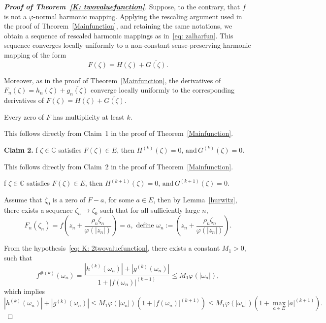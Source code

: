 \documentclass[11pt, reqno]{amsart}
\numberwithin{equation}{section}
\theoremstyle{definition}
\theoremstyle{remark}
\theoremstyle{plain}
\begin{document}
\begin{proof}[\bf{Proof of Theorem~\ref{K: twovaluefunction}}]
 Suppose, to the contrary, that $f$ is not a
  $\varphi$-normal harmonic mapping.
   Applying the rescaling
argument used in the proof of Theorem~\ref{Mainfunction}, 
and retaining the same notations, we obtain
  a sequence of rescaled harmonic mappings as in~\eqref{eq: zalharfun}.
This sequence converges locally uniformly to a non-constant 
sense-preserving harmonic mapping of the form
  \[
  F(\zeta)=H(\zeta)+\overline{G(\zeta)}.
  \]

Moreover, as in the proof of Theorem~\ref{Mainfunction}, the derivatives
of $F_n(\zeta)=h_n(\zeta)+\overline{g_n(\zeta)}$ converge locally 
uniformly to the corresponding 
derivatives of $F(\zeta)=H(\zeta)+\overline{G(\zeta)}$.\smallskip

 Every zero of $F$ has multiplicity 
at least $k$.\smallskip

This follows directly from Claim~1 in the proof of
Theorem~\ref{Mainfunction}.\smallskip

 \noindent
\textbf{Claim 2.}
f $\zeta \in \mathbb{C}$ satisfies $F(\zeta)\in E$, then
$
H^{(k)}(\zeta)=0,\,
\text{and}\,
G^{(k)}(\zeta)=0.
$\smallskip

This follows directly from Claim~2 in the proof of
Theorem~\ref{Mainfunction}.
\smallskip

 f $\zeta \in \mathbb{C}$ satisfies $F(\zeta)\in E$, 
then
$ H^{(k+1)}(\zeta)=0, 
\,\text{and} \, G^{(k+1)}(\zeta)=0$.

Assume that $\zeta_0$ is a zero of $F-a$, for some $a\in E$, 
then by Lemma~\ref{hurwitz}, there exists a sequence $\zeta_n \to \zeta_0$
 such that for all sufficiently large $n$,
 \[
 F_n(\zeta_n)=f\!\left(
z_n+\frac{\rho_n\zeta_n}{\varphi(|z_n|)}
\right)=a, \,\, \text{define} \,\, \omega_n:=\!\left(
z_n+\frac{\rho_n\zeta_n}{\varphi(|z_n|)}
\right).
 \]
 \smallskip
 
From the hypothesis~\eqref{eq: K: 2twovaluefunction}, there exists a constant 
$M_1>0$, such that
 \[
 f^{\#(k)}(\omega_n)=\frac{|h^{(k)}(\omega_n)|+
 |g^{(k)}(\omega_n)|}{1+|f(\omega_n)|^{(k+1)}}
 \leq M_1\varphi(|\omega_n|),
 \]
 which implies
\begin{equation}\label{*2}
  {|h^{(k)}(\omega_n)|+|g^{(k)}(\omega_n)|}\leq 
  M_1\varphi(|\omega_n|)({1+|f(\omega_n)|^{(k+1)}})
\leq M_1\varphi(|\omega_n|)({1+\max_{a\in E}|a|^{(k+1)}}).
\end{equation}


\end{proof}
\end{document}
